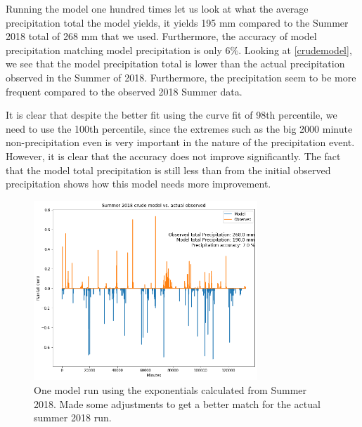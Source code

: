 \documentclass[11pt]{report}
\begin{document}
Running the model one hundred times let us look at what the average
precipitation total the model yields, it yields 195 mm compared to the
Summer 2018 total of 268 mm that we used. Furthermore, the accuracy of model
precipitation matching model precipitation is only 6$\%$. Looking at
\ref{crudemodel}, we see that the model precipitation total is lower than
the actual precipitation observed in the Summer of 2018. Furthermore, the
precipitation seem to be more frequent compared to the observed 2018 Summer
data.

It is clear that despite the better fit using the curve fit of 98th
percentile, we need to use the 100th percentile, since the extremes such as
the big 2000 minute non-precipitation even is very important in the nature
of the precipitation event. However, it is clear that the accuracy does not
improve significantly. The fact that the model total precipitation is still
less than from the initial observed precipitation shows how this model needs
more improvement.
\clearpage

\begin{figure}[t]
  \centering
  \includegraphics[width=0.75\textwidth]{Figures/best_one_run.png}
  \caption[Modified run using Summer 2018 climatology]
  {\label{crudermodel} One model run using the exponentials calculated from
    Summer 2018. Made some adjustments to get a better match for the actual
    summer 2018 run.}
\end{figure}
\end{document}
